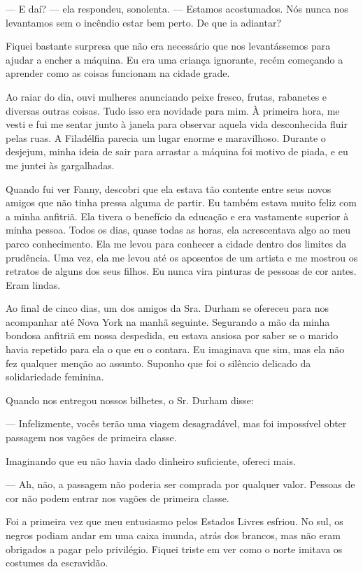 --- E daí? --- ela respondeu,
sonolenta. --- Estamos acostumados. Nós nunca nos levantamos sem o
incêndio estar bem perto. De que ia adiantar?

Fiquei bastante surpresa que não era
necessário que nos levantássemos para ajudar a encher a máquina. Eu era
uma criança ignorante, recém começando a aprender como as coisas
funcionam na cidade grade.

Ao raiar do dia, ouvi mulheres
anunciando peixe fresco, frutas, rabanetes e diversas outras coisas.
Tudo isso era novidade para mim. À primeira hora, me vesti e fui me
sentar junto à janela para observar aquela vida desconhecida fluir pelas
ruas. A Filadélfia parecia um lugar enorme e maravilhoso. Durante o
desjejum, minha ideia de sair para arrastar a máquina foi motivo de
piada, e eu me juntei às gargalhadas.

Quando fui ver Fanny, descobri que ela
estava tão contente entre seus novos amigos que não tinha pressa alguma
de partir. Eu também estava muito feliz com a minha anfitriã. Ela tivera
o benefício da educação e era vastamente superior à minha pessoa. Todos
os dias, quase todas as horas, ela acrescentava algo ao meu parco
conhecimento. Ela me levou para conhecer a cidade dentro dos limites da
prudência. Uma vez, ela me levou até os aposentos de um artista e me
mostrou os retratos de alguns dos seus filhos. Eu nunca vira pinturas de
pessoas de cor antes. Eram lindas.

Ao final de cinco dias, um dos amigos
da Sra. Durham se ofereceu para nos acompanhar até Nova York na manhã
seguinte. Segurando a mão da minha bondosa anfitriã em nossa despedida,
eu estava ansiosa por saber se o marido havia repetido para ela o que eu
o contara. Eu imaginava que sim, mas ela não fez qualquer menção ao
assunto. Suponho que foi o silêncio delicado da solidariedade feminina.

Quando nos entregou nossos bilhetes, o
Sr. Durham disse:

--- Infelizmente, vocês terão uma viagem desagradável, mas foi
impossível obter passagem nos vagões de primeira classe.

Imaginando que eu não havia dado
dinheiro suficiente, ofereci mais.

--- Ah, não, a passagem não poderia ser comprada por qualquer valor.
Pessoas de cor não podem entrar nos vagões de primeira classe.

Foi a primeira vez que meu entusiasmo
pelos Estados Livres esfriou. No sul, os negros podiam andar em uma
caixa imunda, atrás dos brancos, mas não eram obrigados a pagar pelo
privilégio. Fiquei triste em ver como o norte imitava os costumes da
escravidão.

